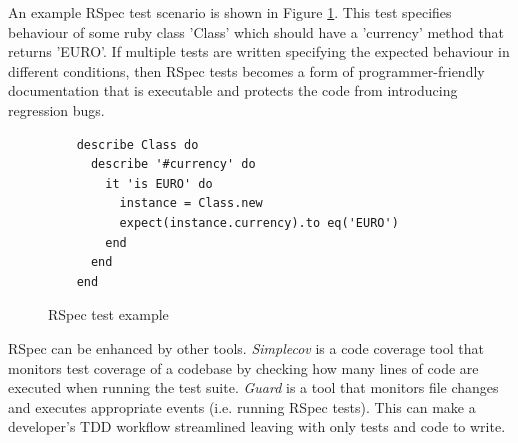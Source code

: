 An example RSpec test scenario is shown in Figure \ref{figure:RSpec}. This test
specifies behaviour of some ruby class 'Class' which should have a 'currency'
method that returns 'EURO'. If multiple tests are written specifying the
expected behaviour in different conditions, then RSpec tests becomes a form of
programmer-friendly documentation that is executable and protects the code from
introducing regression bugs.

\begin{figure}
  \begin{verbatim}
    describe Class do
      describe '#currency' do
        it 'is EURO' do
          instance = Class.new
          expect(instance.currency).to eq('EURO')
        end
      end
    end
  \end{verbatim}
  \caption{
    RSpec test example
    \label{figure:RSpec}
  }
\end{figure}

RSpec can be enhanced by other tools. \textit{Simplecov} \parencite{Simplecov}
is a code coverage tool that monitors test coverage of a codebase by checking
how many lines of code are executed when running the test suite. \textit{Guard}
\parencite{Guard} is a tool that monitors file changes and executes appropriate
events (i.e. running RSpec tests). This can make a developer's TDD workflow
streamlined leaving with only tests and code to write.
